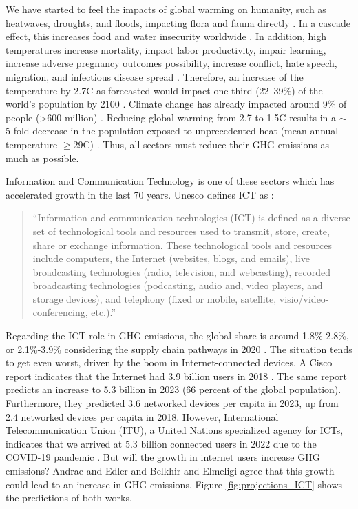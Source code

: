 We have started to feel the impacts of global warming on humanity, such as heatwaves, droughts, and floods, impacting flora and fauna directly \cite{masson2018global, change2022threat}. In a cascade effect, this increases food and water insecurity worldwide \cite{change2022threat, doi:10.1126/science.1239402}. In addition, high temperatures increase mortality, impact labor productivity, impair learning, increase adverse pregnancy outcomes possibility, increase conflict, hate speech, migration, and infectious disease spread \cite{lenton2023quantifying}. Therefore, an increase of the temperature by 2.7\degree C as forecasted would impact one-third (22–39\%) of the world's population by 2100 \cite{lenton2023quantifying}. Climate change has already impacted around 9\% of people (>600 million) \cite{lenton2023quantifying}. Reducing global warming from 2.7 to 1.5\degree C results in a $\sim$5-fold decrease in the population exposed to unprecedented heat (mean annual temperature $\geq$29\degree C) \cite{lenton2023quantifying}. Thus, all sectors must reduce their GHG emissions as much as possible.

Information and Communication Technology is one of these sectors which has accelerated growth in the last 70 years. Unesco defines ICT as \cite{unesco2009guide}:

\begin{quote}
    ``Information and communication technologies (ICT) is defined as a diverse set of technological tools and resources used to transmit, store, create, share or exchange information. These technological tools and resources include computers, the Internet (websites, blogs, and emails), live broadcasting technologies (radio, television, and webcasting), recorded broadcasting technologies (podcasting, audio and, video players, and storage devices), and telephony (fixed or mobile, satellite, visio/video-conferencing, etc.).''
\end{quote}

Regarding the ICT role in GHG emissions, the global share is around 1.8\%-2.8\%, or 2.1\%-3.9\% considering the supply chain pathways in 2020 \cite{freitag2021climate}. The situation tends to get even worst, driven by the boom in Internet-connected devices. A Cisco report indicates that the Internet had 3.9 billion users in 2018 \cite{cisco2020cisco}. The same report predicts an increase to 5.3 billion in 2023 (66 percent of the global population). Furthermore, they predicted 3.6 networked devices per capita in 2023, up from 2.4 networked devices per capita in 2018. However, International Telecommunication Union (ITU), a United Nations specialized agency for ICTs, indicates that we arrived at 5.3 billion connected users in 2022 due to the COVID-19 pandemic \cite{ITU2022}. But will the growth in internet users increase GHG emissions? Andrae and Edler \cite{andrae2015global} and Belkhir and Elmeligi \cite{belkhir2018assessing} agree that this growth could lead to an increase in GHG emissions. Figure \ref{fig:projections_ICT} shows the predictions of both works.

